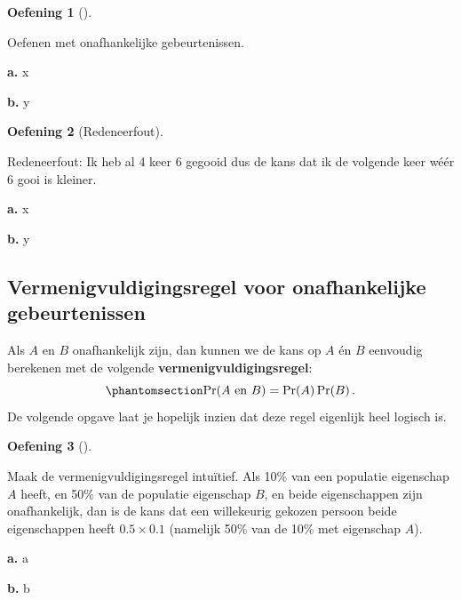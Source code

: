 \documentclass[
  a4paper,
]{scrbook}
\theoremstyle{definition}
\newtheorem{exercise}{Oefening}[chapter]
\theoremstyle{definition}
\theoremstyle{remark}
\begin{document}
\begin{exercise}[]\protect\hypertarget{exr-onafhankelijk}{}\label{exr-onafhankelijk}

Oefenen met onafhankelijke gebeurtenissen.

\textbf{a.} x

\textbf{b.} y

\end{exercise}

\begin{exercise}[Redeneerfout]\protect\hypertarget{exr-redeneerfout}{}\label{exr-redeneerfout}

Redeneerfout: Ik heb al 4 keer 6 gegooid dus de kans dat ik de volgende
keer wéér 6 gooi is kleiner.

\textbf{a.} x

\textbf{b.} y

\end{exercise}

\subsection{Vermenigvuldigingsregel voor onafhankelijke
gebeurtenissen}\label{vermenigvuldigingsregel-voor-onafhankelijke-gebeurtenissen}

Als \(A\) en \(B\) onafhankelijk zijn, dan kunnen we de kans op \(A\) én
\(B\) eenvoudig berekenen met de volgende
\textbf{vermenigvuldigingsregel}:
\begin{equation}\phantomsection\label{eq-vermenigvuldigingsregel}{ 
\textrm{Pr}\!\left(A \textrm{ en } B\right) = \textrm{Pr}\!\left(A\right)\textrm{Pr}\!\left(B\right).
}\end{equation} De volgende opgave laat je hopelijk inzien dat deze
regel eigenlijk heel logisch is.

\begin{exercise}[]\protect\hypertarget{exr-vermenigingsregel-intuitie}{}\label{exr-vermenigingsregel-intuitie}

Maak de vermenigvuldigingsregel intuïtief. Als 10\% van een populatie
eigenschap \(A\) heeft, en 50\% van de populatie eigenschap \(B\), en
beide eigenschappen zijn onafhankelijk, dan is de kans dat een
willekeurig gekozen persoon beide eigenschappen heeft \(0.5\times 0.1\)
(namelijk 50\% van de 10\% met eigenschap \(A\)).

\textbf{a.} a

\textbf{b.} b

\end{exercise}
\end{document}

